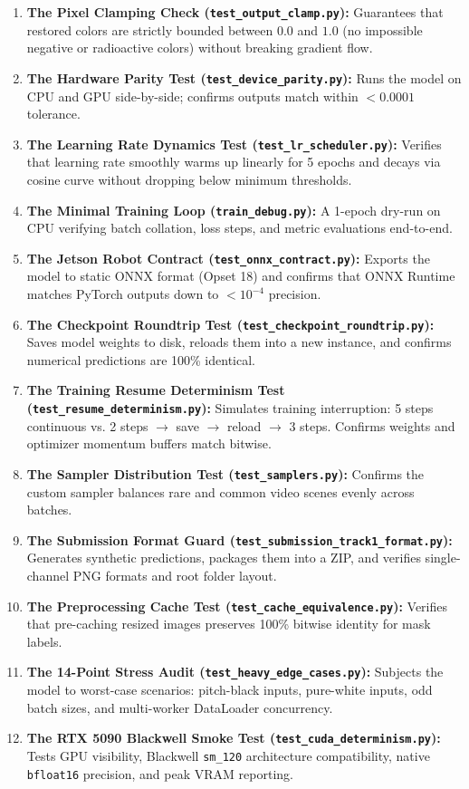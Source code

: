 \documentclass[10pt,a4paper]{article}
\begin{document}
\begin{enumerate}[noitemsep,topsep=1pt,leftmargin=1.4em]
    \item \textbf{The Pixel Clamping Check (\texttt{test\_output\_clamp.py}):} Guarantees that restored colors are strictly bounded between $0.0$ and $1.0$ (no impossible negative or radioactive colors) without breaking gradient flow.
    \item \textbf{The Hardware Parity Test (\texttt{test\_device\_parity.py}):} Runs the model on CPU and GPU side-by-side; confirms outputs match within $< 0.0001$ tolerance.
    \item \textbf{The Learning Rate Dynamics Test (\texttt{test\_lr\_scheduler.py}):} Verifies that learning rate smoothly warms up linearly for 5 epochs and decays via cosine curve without dropping below minimum thresholds.
    \item \textbf{The Minimal Training Loop (\texttt{train\_debug.py}):} A 1-epoch dry-run on CPU verifying batch collation, loss steps, and metric evaluations end-to-end.
    \item \textbf{The Jetson Robot Contract (\texttt{test\_onnx\_contract.py}):} Exports the model to static ONNX format (Opset 18) and confirms that ONNX Runtime matches PyTorch outputs down to $< 10^{-4}$ precision.
    \item \textbf{The Checkpoint Roundtrip Test (\texttt{test\_checkpoint\_roundtrip.py}):} Saves model weights to disk, reloads them into a new instance, and confirms numerical predictions are 100\% identical.
    \item \textbf{The Training Resume Determinism Test (\texttt{test\_resume\_determinism.py}):} Simulates training interruption: 5 steps continuous vs. 2 steps $\to$ save $\to$ reload $\to$ 3 steps. Confirms weights and optimizer momentum buffers match bitwise.
    \item \textbf{The Sampler Distribution Test (\texttt{test\_samplers.py}):} Confirms the custom sampler balances rare and common video scenes evenly across batches.
    \item \textbf{The Submission Format Guard (\texttt{test\_submission\_track1\_format.py}):} Generates synthetic predictions, packages them into a ZIP, and verifies single-channel PNG formats and root folder layout.
    \item \textbf{The Preprocessing Cache Test (\texttt{test\_cache_equivalence.py}):} Verifies that pre-caching resized images preserves 100\% bitwise identity for mask labels.
    \item \textbf{The 14-Point Stress Audit (\texttt{test\_heavy\_edge\_cases.py}):} Subjects the model to worst-case scenarios: pitch-black inputs, pure-white inputs, odd batch sizes, and multi-worker DataLoader concurrency.
    \item \textbf{The RTX 5090 Blackwell Smoke Test (\texttt{test\_cuda_determinism.py}):} Tests GPU visibility, Blackwell \texttt{sm\_120} architecture compatibility, native \texttt{bfloat16} precision, and peak VRAM reporting.
\end{enumerate}
\end{document}
